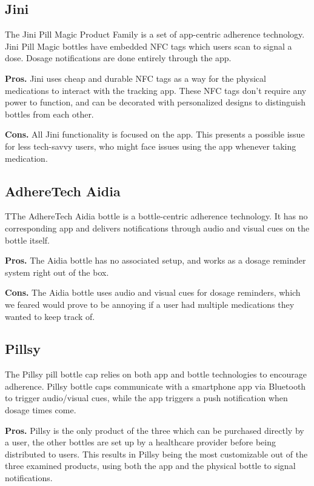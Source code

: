 \documentclass[sigconf]{acmart}
\begin{document}
\subsection{Jini}
The Jini Pill Magic Product Family \cite{jini} is a set of app-centric adherence technology. Jini Pill Magic bottles have embedded NFC tags which users scan to signal a dose. Dosage notifications are done entirely through the app.

\textbf{Pros.} Jini uses cheap and durable NFC tags as a way for the physical medications to interact with the tracking app. These NFC tags don't require any power to function, and can be decorated with personalized designs to distinguish bottles from each other.

\textbf{Cons.} All Jini functionality is focused on the app. This presents a possible issue for less tech-savvy users, who might face issues using the app whenever taking medication.

\subsection{AdhereTech Aidia}
TThe AdhereTech Aidia bottle \cite{aidia} is a bottle-centric adherence technology. It has no corresponding app and delivers notifications through audio and visual cues on the bottle itself.

\textbf{Pros.} The Aidia bottle has no associated setup, and works as a dosage reminder system right out of the box.

\textbf{Cons.} The Aidia bottle uses audio and visual cues for dosage reminders, which we feared would prove to be annoying if a user had multiple medications they wanted to keep track of.

\subsection{Pillsy}
The Pillsy pill bottle cap \cite{pillsy} relies on both app and bottle technologies to encourage adherence. Pillsy bottle caps communicate with a smartphone app via Bluetooth to trigger audio/visual cues, while the app triggers a push notification when dosage times come.

\textbf{Pros.} Pillsy is the only product of the three which can be purchased directly by a user, the other bottles are set up by a healthcare provider before being distributed to users. This results in Pillsy being the most customizable out of the three examined products, using both the app and the physical bottle to signal notifications.
\end{document}
